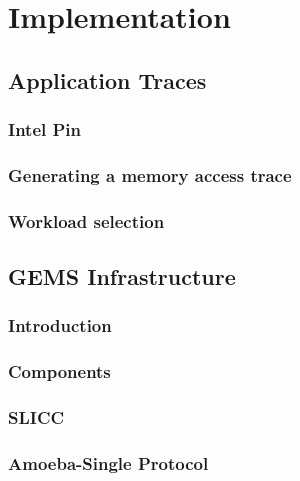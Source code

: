 
%
%

\chapter{Implementation}
\label{chap:implementation}

\section{Application Traces}
\subsection{Intel Pin}
\subsection{Generating a memory access trace}
\subsection{Workload selection}
\section{GEMS Infrastructure}
\subsection{Introduction}
\subsection{Components}
\subsection{SLICC}
\subsection{Amoeba-Single Protocol}
